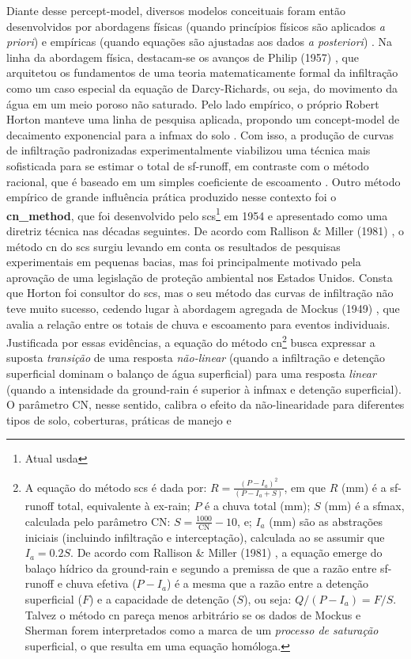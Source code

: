 \documentclass[./main.tex]{subfiles}
\begin{document}
\par Diante desse \gls{percept-model}, diversos modelos conceituais foram então desenvolvidos por abordagens físicas (quando princípios físicos são aplicados \textit{a priori}) e empíricas (quando equações são ajustadas aos dados \textit{a posteriori})  \cite{mishra2003}. Na linha da abordagem física, destacam-se os avanços de Philip (1957) \cite{philip1957}, que arquitetou os fundamentos de uma \gls{teoria} matematicamente formal da infiltração como um caso especial da equação de Darcy-Richards, ou seja, do movimento da água em um meio poroso não saturado. Pelo lado empírico, o próprio Robert Horton manteve uma linha de pesquisa aplicada, propondo um \gls{concept-model} de decaimento exponencial para a \gls{infmax} do solo \cite{Horton1939}. Com isso, a produção de curvas de infiltração padronizadas experimentalmente viabilizou uma técnica mais sofisticada para se estimar o total de \gls{sf-runoff}, em contraste com o método racional, que é baseado em um simples coeficiente de escoamento \cite{Cook1946}. Outro método empírico de grande influência prática produzido nesse contexto foi o \textbf{\gls{cn_method}}, que foi desenvolvido pelo \acrfull{scs}\footnote{Atual \acrfull{usda}} em 1954 e apresentado como uma diretriz técnica nas décadas seguintes. De acordo com Rallison \& Miller (1981) \cite{Rallison1981}, o método \acrshort{cn} do \acrshort{scs} surgiu levando em conta os resultados de pesquisas experimentais em pequenas bacias, mas foi principalmente motivado pela aprovação de uma legislação de proteção ambiental nos Estados Unidos. Consta que Horton foi consultor do \acrshort{scs}, mas o seu método das curvas de infiltração não teve muito sucesso, cedendo lugar à abordagem agregada de Mockus (1949) \cite{mockus1949}, que avalia a relação entre os totais de chuva e escoamento para eventos individuais. Justificada por essas evidências, a equação do método \acrshort{cn}\footnote{A equação do método \acrshort{scs} é dada por: $R = \frac{(P - I_a)^{2}}{(P - I_a + S)}$, em que $R$ (mm) é a \gls{sf-runoff} total, equivalente à \gls{ex-rain}; $P$ é a chuva total (mm); $S$ (mm) é a \gls{sfmax}, calculada pelo parâmetro CN: $S = \frac{1000}{\text{CN}}-10$, e; $I_a$ (mm) são as abstrações iniciais (incluindo infiltração e interceptação), calculada ao se assumir que $I_a = 0.2S$. De acordo com Rallison \& Miller (1981) \cite{Rallison1981}, a equação emerge do balaço hídrico da \gls{ground-rain} e segundo a premissa de que a razão entre \gls{sf-runoff} e chuva efetiva ($P - I_a$) é a mesma que a razão entre a detenção superficial ($F$) e a capacidade de detenção ($S$), ou seja: $Q/(P-I_a) = F/S$. Talvez o método \acrshort{cn} pareça menos arbitrário se os dados de Mockus e Sherman forem interpretados como a marca de um \textit{processo de saturação} superficial, o que resulta em uma equação homóloga.} busca expressar a suposta \textit{transição} de uma resposta \textit{não-linear} (quando a infiltração e detenção superficial dominam o balanço de água superficial) para uma resposta \textit{linear} (quando a intensidade da \gls{ground-rain} é superior à \gls{infmax} e detenção superficial). O parâmetro CN, nesse sentido, calibra o efeito da não-linearidade para diferentes tipos de solo, coberturas, práticas de manejo e 
\end{document}
